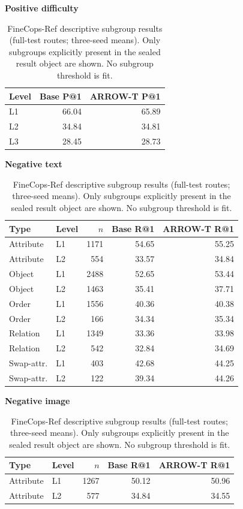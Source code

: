 \begin{table}[t]
\centering
\caption{FineCops-Ref descriptive subgroup results (full-test routes; three-seed means). Only subgroups explicitly present in the sealed result object are shown. No subgroup threshold is fit.}
\label{tab:supp-finecops-subgroups}
\scriptsize
\centering\textbf{Positive difficulty}\par\smallskip
\begin{tabular}{lrr}\toprule
Level & Base P@1 & ARROW-T P@1\\\midrule
L1 & 66.04 & 65.89 \\
L2 & 34.84 & 34.81 \\
L3 & 28.45 & 28.73 \\
\bottomrule\end{tabular}
\par\medskip
\begin{minipage}[t]{0.48\textwidth}
\centering\textbf{Negative text}\par\smallskip
\begin{tabular}{llrrr}\toprule
Type & Level & $n$ & Base R@1 & ARROW-T R@1\\\midrule
Attribute & L1 & 1171 & 54.65 & 55.25 \\
Attribute & L2 & 554 & 33.57 & 34.84 \\
Object & L1 & 2488 & 52.65 & 53.44 \\
Object & L2 & 1463 & 35.41 & 37.71 \\
Order & L1 & 1556 & 40.36 & 40.38 \\
Order & L2 & 166 & 34.34 & 35.34 \\
Relation & L1 & 1349 & 33.36 & 33.98 \\
Relation & L2 & 542 & 32.84 & 34.69 \\
Swap-attr. & L1 & 403 & 42.68 & 44.25 \\
Swap-attr. & L2 & 122 & 39.34 & 44.26 \\
\bottomrule\end{tabular}
\end{minipage}\hfill
\begin{minipage}[t]{0.48\textwidth}
\centering\textbf{Negative image}\par\smallskip
\begin{tabular}{llrrr}\toprule
Type & Level & $n$ & Base R@1 & ARROW-T R@1\\\midrule
Attribute & L1 & 1267 & 50.12 & 50.96 \\
Attribute & L2 & 577 & 34.84 & 34.55 \\

\end{tabular}
\end{minipage}
\end{table}
